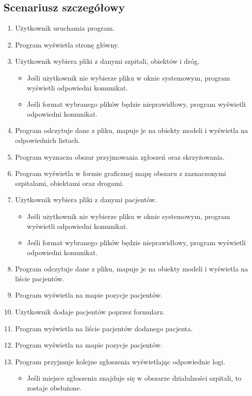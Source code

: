 \documentclass{article}
\begin{document}
\subsection{Scenariusz szczegółowy}
\begin{enumerate}
    \item Użytkownik uruchamia program.
    \item Program wyświetla stronę główny.
    \item Użytkownik wybiera pliki z danymi szpitali, obiektów i dróg.
    \begin{itemize}
        \item Jeśli użytkownik nie wybierze pliku w oknie systemowym, program wyświetli odpowiedni komunikat.
        \item Jeśli format wybranego plików będzie nieprawidłowy, program wyświetli odpowiedni komunikat.
    \end{itemize}
    \item Program odczytuje dane z pliku, mapuje je na obiekty modeli i wyświetla na odpowiednich listach.
    \item Program wyznacza obszar przyjmowania zgłoszeń oraz skrzyżowania.
    \item Program wyświetla w formie graficznej mapę obszaru z zaznaczonymi szpitalami, obiektami oraz drogami.
    \item Użytkownik wybiera pliki z danymi pacjentów.
    \begin{itemize}
        \item Jeśli użytkownik nie wybierze pliku w oknie systemowym, program wyświetli odpowiedni komunikat.
        \item Jeśli format wybranego plików będzie nieprawidłowy, program wyświetli odpowiedni komunikat.
    \end{itemize}
    \item Program odczytuje dane z pliku, mapuje je na obiekty modeli i wyświetla na liście pacjentów.
    \item Program wyświetla na mapie pozycje pacjentów.
    \item Użytkownik dodaje pacjentów poprzez formularz.
    \item Program wyświetla na liście pacjentów dodanego pacjenta.
    \item Program wyświetla na mapie pozycje pacjentów. 
    \item Program przyjmuje kolejne zgłoszenia wyświetlając odpowiednie logi.
    \begin{itemize}
        \item Jeśli miejsce zgłoszenia znajduje się w obszarze działalności szpitali, to zostaje obsłużone.

\end{itemize}
\end{enumerate}
\end{document}
